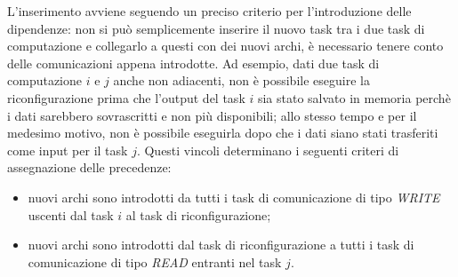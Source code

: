 L'inserimento avviene seguendo un preciso criterio per l'introduzione delle 
dipendenze: non si può semplicemente inserire il nuovo task tra i due task di 
computazione e collegarlo a questi con dei nuovi archi, è necessario tenere 
conto delle comunicazioni appena introdotte. Ad esempio, dati due task di 
computazione $i$ e $j$ anche non adiacenti, non è possibile eseguire la 
riconfigurazione prima che l'output del task $i$ sia stato salvato in memoria 
perchè i dati sarebbero sovrascritti e non più disponibili; allo stesso tempo 
e per il medesimo motivo, non è possibile eseguirla dopo che i dati siano stati 
trasferiti come input per il task $j$. Questi vincoli determinano i seguenti
criteri di assegnazione delle precedenze:
\begin{itemize}
 \item nuovi archi sono introdotti da tutti i task di comunicazione di tipo 
\emph{WRITE} uscenti dal task $i$ al task di riconfigurazione;
 \item nuovi archi sono introdotti dal task di riconfigurazione a tutti i task 
di comunicazione di tipo \emph{READ} entranti nel task $j$.
\end{itemize}


